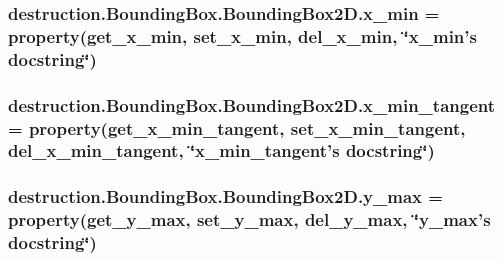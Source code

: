 \hypertarget{classdestruction_1_1_bounding_box_1_1_bounding_box2_d_a147800925cbc6a6b4f96e50b2adc5b31}{
\subsubsection[{x\-\_\-min}]{\setlength{\rightskip}{0pt plus 5cm}destruction.\-Bounding\-Box.\-Bounding\-Box2\-D.\-x\-\_\-min = property({\bf get\-\_\-x\-\_\-min}, {\bf set\-\_\-x\-\_\-min}, {\bf del\-\_\-x\-\_\-min}, \char`\"{}x\-\_\-min's docstring\char`\"{})\hspace{0.3cm}{\ttfamily [static]}}}\label{classdestruction_1_1_bounding_box_1_1_bounding_box2_d_a147800925cbc6a6b4f96e50b2adc5b31}
\hypertarget{classdestruction_1_1_bounding_box_1_1_bounding_box2_d_af8402585a8298dc53bd6e6febf0036cb}{
\subsubsection[{x\-\_\-min\-\_\-tangent}]{\setlength{\rightskip}{0pt plus 5cm}destruction.\-Bounding\-Box.\-Bounding\-Box2\-D.\-x\-\_\-min\-\_\-tangent = property({\bf get\-\_\-x\-\_\-min\-\_\-tangent}, {\bf set\-\_\-x\-\_\-min\-\_\-tangent}, {\bf del\-\_\-x\-\_\-min\-\_\-tangent}, \char`\"{}x\-\_\-min\-\_\-tangent's docstring\char`\"{})\hspace{0.3cm}{\ttfamily [static]}}}\label{classdestruction_1_1_bounding_box_1_1_bounding_box2_d_af8402585a8298dc53bd6e6febf0036cb}
\hypertarget{classdestruction_1_1_bounding_box_1_1_bounding_box2_d_a9f18220c526794f64915251fe6dab136}{
\subsubsection[{y\-\_\-max}]{\setlength{\rightskip}{0pt plus 5cm}destruction.\-Bounding\-Box.\-Bounding\-Box2\-D.\-y\-\_\-max = property({\bf get\-\_\-y\-\_\-max}, {\bf set\-\_\-y\-\_\-max}, {\bf del\-\_\-y\-\_\-max}, \char`\"{}y\-\_\-max's docstring\char`\"{})\hspace{0.3cm}{\ttfamily [static]}}}\label{classdestruction_1_1_bounding_box_1_1_bounding_box2_d_a9f18220c526794f64915251fe6dab136}

